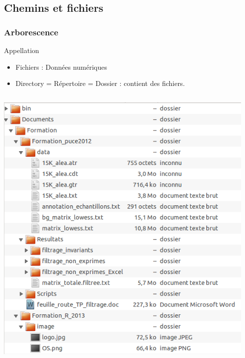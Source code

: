 \documentclass[table,svgnames,hyperref={pdfpagemode=FullScreen}]{beamer}
\begin{document}
\subsection{Chemins et fichiers}
\begin{frame}
	\frametitle{Arborescence}
	\begin{block}{Appellation}
		\begin{itemize}
			\item Fichiers : Données numériques
			\item Directory = Répertoire = Dossier : contient des fichiers.
		\end{itemize}
	\end{block}
	\begin{columns}
		\begin{column}[c]{5cm}
			\includegraphics[scale=0.25]{image/ArboUbuntu.png}
		\end{column}
			\begin{column}[c]{5cm}

\end{column}
\end{columns}
\end{frame}
\end{document}
